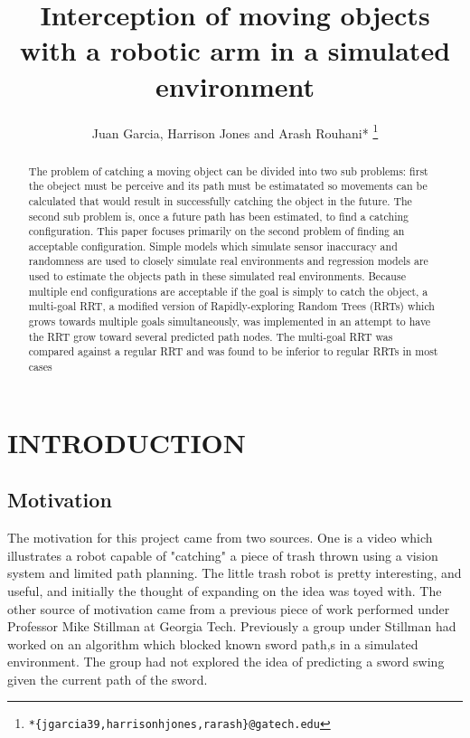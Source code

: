 \documentclass[letterpaper, 10 pt, conference]{ieeeconf}  %
\title{\LARGE \bf
Interception of moving objects with a robotic arm in a simulated environment
}
\author{Juan Garcia, Harrison Jones and Arash Rouhani*
  \thanks{\texttt{*\{jgarcia39,harrisonhjones,rarash\}@gatech.edu}}
}
\begin{document}
\maketitle
\thispagestyle{empty}
\pagestyle{empty}


\begin{abstract}

The problem of catching a moving object can be divided into two sub problems: first the obeject must be perceive and its path must be estimatated so movements can be calculated that would result in successfully catching the object in the future. The second sub problem is, once a future path has been estimated, to find a catching configuration. This paper focuses primarily on the second problem of finding an acceptable configuration. Simple models which simulate sensor inaccuracy and randomness are used to closely simulate real environments and  regression models are used to estimate the objects path in these simulated real environments. Because  multiple end configurations are acceptable if the goal is simply to catch the object, a multi-goal RRT, a modified version of Rapidly-exploring Random Trees (RRTs) which grows towards multiple goals simultaneously, was implemented in an attempt to have the RRT grow toward several predicted path nodes. The multi-goal RRT was compared against a regular RRT and was found to be inferior to regular RRTs in most cases

\end{abstract}


\section{INTRODUCTION}

\subsection{Motivation}

The motivation for this project came from two sources. One is a video which
illustrates a robot capable of "catching" a piece of trash thrown using a
vision system and limited path planning. The little trash robot is pretty
interesting, and useful, and initially the thought of expanding on the idea was
toyed with. The other source of motivation came from a previous piece of work
performed under Professor Mike Stillman at Georgia Tech. Previously a group
under Stillman had worked on an algorithm which blocked known sword path,s in a
simulated environment. The group had not explored the idea of predicting a
sword swing given the current path of the sword.
\end{document}
